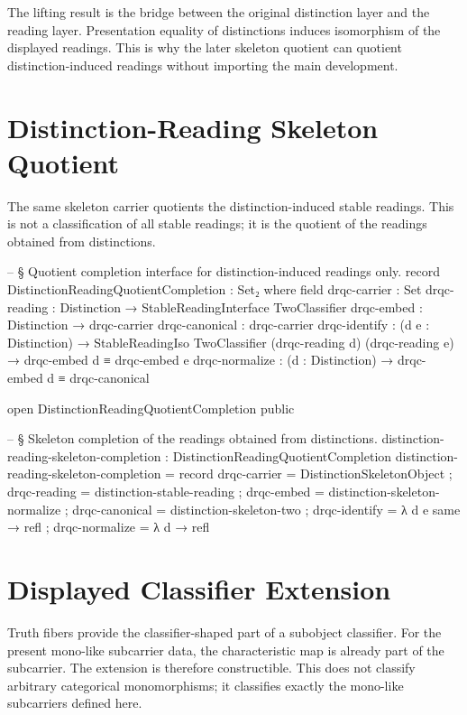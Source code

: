 \documentclass[11pt]{article}
\begin{document}
The lifting result is the bridge between the original distinction layer
and the reading layer.  Presentation equality of distinctions induces
isomorphism of the displayed readings.  This is why the later skeleton
quotient can quotient distinction-induced readings without importing the
main development.

\section{Distinction-Reading Skeleton Quotient}

The same skeleton carrier quotients the distinction-induced stable
readings.  This is not a classification of all stable readings; it is
the quotient of the readings obtained from distinctions.

\begin{code}
-- § Quotient completion interface for distinction-induced readings only.
record DistinctionReadingQuotientCompletion : Set₂ where
  field
    drqc-carrier   : Set
    drqc-reading   : Distinction → StableReadingInterface TwoClassifier
    drqc-embed     : Distinction → drqc-carrier
    drqc-canonical : drqc-carrier
    drqc-identify  : (d e : Distinction) →
                     StableReadingIso TwoClassifier (drqc-reading d) (drqc-reading e) →
                     drqc-embed d ≡ drqc-embed e
    drqc-normalize : (d : Distinction) → drqc-embed d ≡ drqc-canonical

open DistinctionReadingQuotientCompletion public

-- § Skeleton completion of the readings obtained from distinctions.
distinction-reading-skeleton-completion : DistinctionReadingQuotientCompletion
distinction-reading-skeleton-completion = record
  { drqc-carrier   = DistinctionSkeletonObject
  ; drqc-reading   = distinction-stable-reading
  ; drqc-embed     = distinction-skeleton-normalize
  ; drqc-canonical = distinction-skeleton-two
  ; drqc-identify  = λ d e same → refl
  ; drqc-normalize = λ d → refl
  }
\end{code}

\section{Displayed Classifier Extension}

Truth fibers provide the classifier-shaped part of a subobject
classifier.  For the present mono-like subcarrier data, the
characteristic map is already part of the subcarrier.  The extension is
therefore constructible.  This does not classify arbitrary categorical
monomorphisms; it classifies exactly the mono-like subcarriers defined
here.
\end{document}
